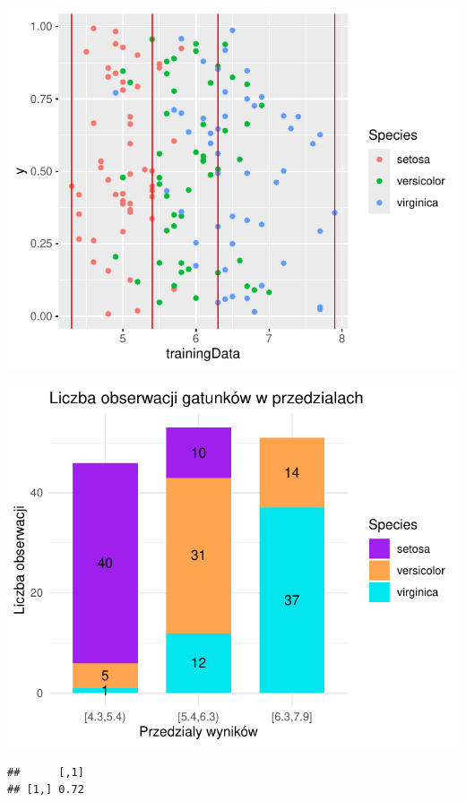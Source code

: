 \documentclass[
  12pt,
]{article}
\begin{document}
\begin{center}\includegraphics{Sprawozdanie2_files/figure-latex/frequences_najg-2} \end{center}

\begin{center}\includegraphics{Sprawozdanie2_files/figure-latex/tabela_kondygnacji_1_najg-1} \end{center}

\begin{verbatim}
##      [,1]
## [1,] 0.72
\end{verbatim}
\end{document}
